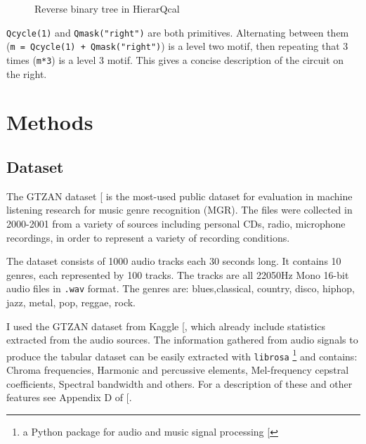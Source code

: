 \documentclass[
  13pt,
  a4paper,
  DIV=11,
  numbers=noendperiod]{scrreprt}
\begin{document}
\begin{figure}


\caption{\label{fig-reverse-binary-tree}Reverse binary tree in
HierarQcal}

\end{figure}%

\texttt{Qcycle(1)} and \texttt{Qmask("right")} are both primitives.
Alternating between them (\texttt{m\ =\ Qcycle(1)\ +\ Qmask("right")})
is a level two motif, then repeating that 3 times (\texttt{m*3}) is a
level 3 motif. This gives a concise description of the circuit on the
right.


\chapter{Methods}\label{methods}

\section{Dataset}\label{dataset}

The GTZAN dataset
{[}\citeproc{ref-gtzan_tzanetakis_essl_cook_2001}{8}{]} is the most-used
public dataset for evaluation in machine listening research for music
genre recognition (MGR). The files were collected in 2000-2001 from a
variety of sources including personal CDs, radio, microphone recordings,
in order to represent a variety of recording conditions.

The dataset consists of 1000 audio tracks each 30 seconds long. It
contains 10 genres, each represented by 100 tracks. The tracks are all
22050Hz Mono 16-bit audio files in \texttt{.wav} format. The genres are:
blues,classical, country, disco, hiphop, jazz, metal, pop, reggae, rock.

I used the GTZAN dataset from Kaggle
{[}\citeproc{ref-GTZAN_kaggle}{9}{]}, which already include statistics
extracted from the audio sources. The information gathered from audio
signals to produce the tabular dataset can be easily extracted with
\texttt{librosa} \footnote{a Python package for audio and music signal
  processing {[}\citeproc{ref-mcfee2015librosa}{10}{]}} and contains:
Chroma frequencies, Harmonic and percussive elements, Mel-frequency
cepstral coefficients, Spectral bandwidth and others. For a description
of these and other features see Appendix D of
{[}\citeproc{ref-lourens2023hierarchical}{1}{]}.
\end{document}
